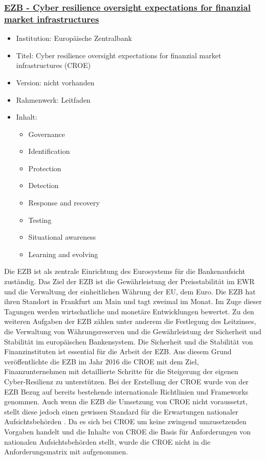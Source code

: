 
\subsubsection{\underline{EZB - Cyber resilience oversight expectations for finanzial market infrastructures}}
\begin{itemize}
    \item Institution: Europäische Zentralbank 
    \item Titel: Cyber resilience oversight expectations for finanzial market infrastructures (CROE) \autocite{CROE}
    \item Version: nicht vorhanden
    \item Rahmenwerk: Leitfaden
    \item Inhalt: 
    \begin{itemize}
        \item Governance
        \item Identification
        \item Protection
        \item Detection
        \item Response and recovery
        \item Testing
        \item Situational awareness
        \item Learning and evolving
    \end{itemize}
\end{itemize}
\bigbreak
Die EZB ist als zentrale Einrichtung des Eurosystems für die Bankenaufsicht zuständig. Das Ziel der EZB ist die Gewährleistung der Preisstabilität im EWR und die Verwaltung der einheitlichen Währung der EU, dem Euro. Die EZB hat ihren Standort in Frankfurt am Main und tagt zweimal im Monat. Im Zuge dieser Tagungen werden wirtschatliche und monetäre Entwicklungen bewertet. 
Zu den weiteren Aufgaben der EZB zählen unter anderem die Festlegung des Leitzinses, die Verwaltung von Währungsreserven und die Gewährleistung der Sicherheit und Stabilität im europäischen Bankensystem. \autocite{EZB}
\bigbreak
Die Sicherheit und die Stabilität von Finanzinstituten ist essential für die Arbeit der EZB. Aus diesem Grund veröffentlichte die EZB im Jahr 2016 die CROE mit dem Ziel, Finanzunternehmen mit detaillierte Schritte für die Steigerung der eigenen Cyber-Resilienz zu unterstützen. Bei der Erstellung der CROE wurde von der EZB Bezug auf bereits bestehende internationale Richtlinien und Frameworks genommen. Auch wenn die EZB die Umsetzung von CROE nicht voraussetzt, stellt diese jedoch einen gewissen Standard für die Erwartungen nationaler Aufsichtsbehörden \autocite{CROE}. Da es sich bei CROE um keine zwingend umzusetzenden Vorgaben handelt und die Inhalte von CROE die Basis für Anforderungen von nationalen Aufsichtsbehörden stellt, wurde die CROE nicht in die Anforderungsmatrix mit aufgenommen. 

